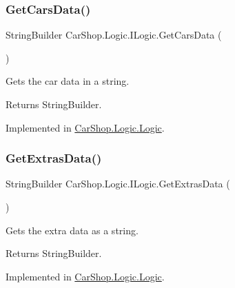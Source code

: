 \subsubsection{\texorpdfstring{Get\+Cars\+Data()}{GetCarsData()}}
{\footnotesize\ttfamily String\+Builder Car\+Shop.\+Logic.\+I\+Logic.\+Get\+Cars\+Data (\begin{DoxyParamCaption}{ }\end{DoxyParamCaption})}



Gets the car data in a string. 

\begin{DoxyReturn}{Returns}
String\+Builder.
\end{DoxyReturn}


Implemented in \mbox{\hyperlink{class_car_shop_1_1_logic_1_1_logic_a74048c2231e34ae8d86a5357a073f0cd}{Car\+Shop.\+Logic.\+Logic}}.

\mbox{\label{interface_car_shop_1_1_logic_1_1_i_logic_a5ad3fa8e566e99e43a70a5e9f7ffb114}} 
\subsubsection{\texorpdfstring{Get\+Extras\+Data()}{GetExtrasData()}}
{\footnotesize\ttfamily String\+Builder Car\+Shop.\+Logic.\+I\+Logic.\+Get\+Extras\+Data (\begin{DoxyParamCaption}{ }\end{DoxyParamCaption})}



Gets the extra data as a string. 

\begin{DoxyReturn}{Returns}
String\+Builder.
\end{DoxyReturn}


Implemented in \mbox{\hyperlink{class_car_shop_1_1_logic_1_1_logic_ac829fe0e30078fca2abc5eb64eea4f62}{Car\+Shop.\+Logic.\+Logic}}.

\mbox{\label{interface_car_shop_1_1_logic_1_1_i_logic_a3be954920563765e2f6a2ea6d62b4159}} 
